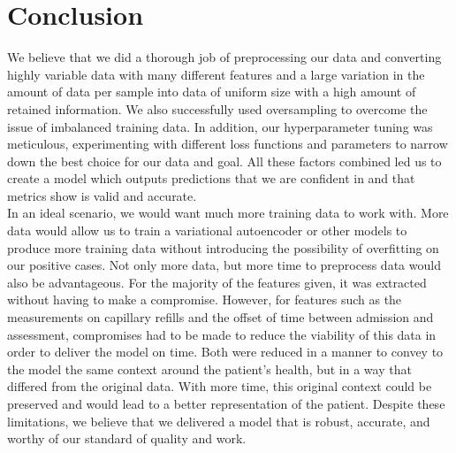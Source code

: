 \documentclass{article}
\begin{document}
\section{Conclusion}

We believe that we did a thorough job of preprocessing our data and converting highly variable data with many different features and a large 
variation in the amount of data per sample into data of uniform size with a high amount of retained information. We also successfully 
used oversampling to overcome the issue of imbalanced training data. In addition, our hyperparameter tuning was meticulous, experimenting with different loss functions and parameters to narrow down the best choice for our data and goal. All these factors combined led us to create a model which outputs predictions that we are confident in and that metrics show is valid and accurate. \\

In an ideal scenario, we would want much more training data to work
with. More data would allow us to train a variational autoencoder or other models to produce more training data without introducing the 
possibility of overfitting on our positive cases. Not only more data, but more time to preprocess data would also be advantageous. For the majority of the features given, it was extracted without having to make a compromise. However, for features such as the measurements on capillary refills and the offset of time between admission and assessment, compromises had to be made to reduce the viability of this data in order to deliver the model on time. Both were reduced in a manner to convey to the model the same context around the patient's health, but in a way that differed from the original data. With more time, this original context could be preserved and would lead to a better representation of the patient. Despite these limitations, we believe that we delivered a model that is robust, accurate, and worthy of our standard of quality and work.
\end{document}
